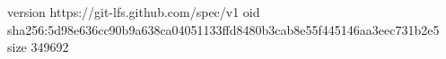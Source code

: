 version https://git-lfs.github.com/spec/v1
oid sha256:5d98e636cc90b9a638ca04051133ffd8480b3cab8e55f445146aa3eec731b2e5
size 349692
